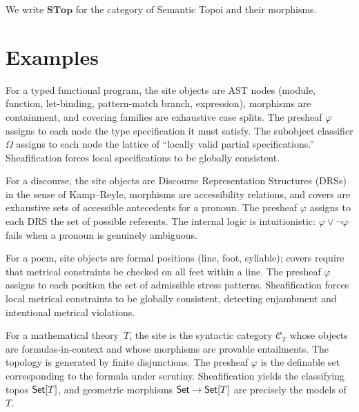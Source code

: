We write $\mathbf{STop}$ for the category of Semantic Topoi and their
morphisms.

\section{Examples}
\label{sec:stop-examples}

\begin{example}
\label{ex:ast-topos}
For a typed functional program, the site objects are AST nodes
(module, function, let-binding, pattern-match branch, expression),
morphisms are containment, and covering families are exhaustive case
splits.  The presheaf $\varphi$ assigns to each node the type
specification it must satisfy.  The subobject classifier $\Omega$
assigns to each node the lattice of ``locally valid partial
specifications.''  Sheafification forces local specifications to be
globally consistent.
\end{example}

\begin{example}
\label{ex:discourse-topos}
For a discourse, the site objects are Discourse Representation
Structures (DRSs) in the sense of Kamp--Reyle, morphisms are
accessibility relations, and covers are exhaustive sets of accessible
antecedents for a pronoun.  The presheaf $\varphi$ assigns to each DRS
the set of possible referents.  The internal logic is intuitionistic:
$\varphi \vee \neg\varphi$ fails when a pronoun is genuinely ambiguous.
\end{example}

\begin{example}
\label{ex:poetry-topos}
For a poem, site objects are formal positions (line, foot, syllable);
covers require that metrical constraints be checked on all feet within
a line.  The presheaf $\varphi$ assigns to each position the set of
admissible stress patterns.  Sheafification forces local metrical
constraints to be globally consistent, detecting enjambment and
intentional metrical violations.
\end{example}

\begin{example}
For a mathematical theory~$T$, the site is the syntactic category
$\mathcal{C}_T$ whose objects are formulas-in-context and whose
morphisms are provable entailments.  The topology is generated by
finite disjunctions.  The presheaf $\varphi$ is the definable set
corresponding to the formula under scrutiny.  Sheafification yields the
classifying topos $\mathsf{Set}[T]$, and geometric morphisms
$\mathsf{Set} \to \mathsf{Set}[T]$ are precisely the models of~$T$.
\end{example}

